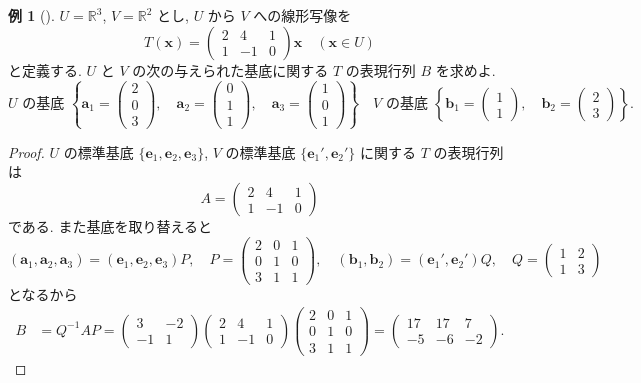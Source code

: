 \documentclass[dvipdfmx,a4paper,11pt]{article} %
\theoremstyle{definition}
\newtheorem{eg}[thm]{例}
\begin{document}
\begin{eg}
[{\cite[例題5.2.1]{M}}]
$U=\mathbb{R}^3$, $V=\mathbb{R}^2$ とし, $U$ から $V$ への線形写像を
\[
T(\bm{x})=
\begin{pmatrix}
2&4&1\\
1&-1&0
\end{pmatrix}
\bm{x}
\quad (\bm{x}\in U)
\]
と定義する. $U$ と $V$ の次の与えられた基底に関する $T$ の表現行列 $B$ を求めよ.
\[
U\text{ の基底 }
\left\{
\bm{a}_1=
\begin{pmatrix}
2\\
0\\
3
\end{pmatrix},
\quad
\bm{a}_2=
\begin{pmatrix}
0\\
1\\
1
\end{pmatrix},
\quad
\bm{a}_3=
\begin{pmatrix}
1\\
0\\
1
\end{pmatrix}
\right\}\quad
V\text{ の基底 }
\left\{
\bm{b}_1=
\begin{pmatrix}
1\\
1
\end{pmatrix},
\quad
\bm{b}_2=
\begin{pmatrix}
2\\
3
\end{pmatrix}
\right\}.
\]
\end{eg}
\begin{proof}
$U$ の標準基底 $\{\bm{e}_1,\bm{e}_2,\bm{e}_3\}$, $V$ の標準基底 $\{\bm{e}_1',\bm{e}_2'\}$ に関する $T$ の表現行列は
\[
A=
\begin{pmatrix}
2&4&1\\
1&-1&0
\end{pmatrix}
\]
である. また基底を取り替えると
\[
(\bm{a}_1,\bm{a}_2,\bm{a}_3)=(\bm{e}_1,\bm{e}_2,\bm{e}_3)P,
\quad
P=
\begin{pmatrix}
2&0&1\\
0&1&0\\
3&1&1
\end{pmatrix},
\quad
(\bm{b}_1,\bm{b}_2)=(\bm{e}_1',\bm{e}_2')Q,
\quad
Q=
\begin{pmatrix}
1&2\\
1&3
\end{pmatrix}
\]
となるから
\[
\begin{aligned}
B
&=Q^{-1}AP
=
\begin{pmatrix}
3&-2\\
-1&1
\end{pmatrix}
\begin{pmatrix}
2&4&1\\
1&-1&0
\end{pmatrix}
\begin{pmatrix}
2&0&1\\
0&1&0\\
3&1&1
\end{pmatrix}=
\begin{pmatrix}
17&17&7\\
-5&-6&-2
\end{pmatrix}.
\end{aligned}
\]
\end{proof}
\end{document}
